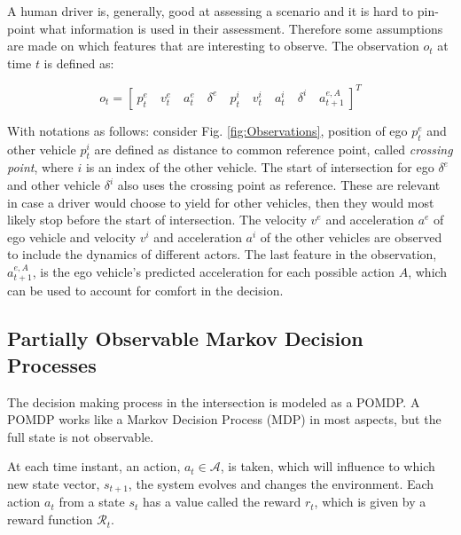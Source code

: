 A human driver is, generally, good at assessing a scenario and it is hard to pin-point what information is used in their assessment. Therefore some assumptions are made on which features that are interesting to observe. The observation $o_t$ at time $t$ is defined as:

\begin{equation}
o_t = [\  p^e_t \quad v^e_t \quad a^e_t \quad \delta^e \quad p^i_t \quad v^i_t \quad a^i_t \quad \delta^i \quad a^{e, A}_{t+1} \  ]^T
\end{equation}

With notations as follows: consider Fig. \ref{fig:Observations}, position of ego $p^e_t$ and other vehicle $p^i_t$ are defined as distance to common reference point, called {\em crossing point}, where $i$ is an index of the other vehicle. 
The start of intersection for ego $\delta^e$ and other vehicle $\delta^i$ also uses the crossing point as reference. These are relevant in case a driver would choose to yield for other vehicles, then they would most likely stop before the start of intersection. The velocity $v^e$ and acceleration $a^e$ of ego vehicle and velocity  $v^i$ and acceleration $a^i$ of the other vehicles are observed to include the dynamics of different actors. The last feature in the observation, $a^{e, A}_{t+1}$, is the ego vehicle's predicted acceleration for each possible action $A$, which can be used to account for comfort in the decision.


\subsection{Partially Observable Markov Decision Processes}
The decision making process in the intersection is modeled as a POMDP. A POMDP works like a Markov Decision Process (MDP) \cite{BellmanMDP} in most aspects, but the full state is not observable. 

At each time instant, an action, $a_t\in \mathcal{A}$, is taken, which will influence to which new state vector, $s_{t+1}$, the system evolves and changes the environment. Each action $a_t$ from a state $s_t$ has a value called the reward $r_t$, which is given by a reward function $\mathcal{R}_t $.

